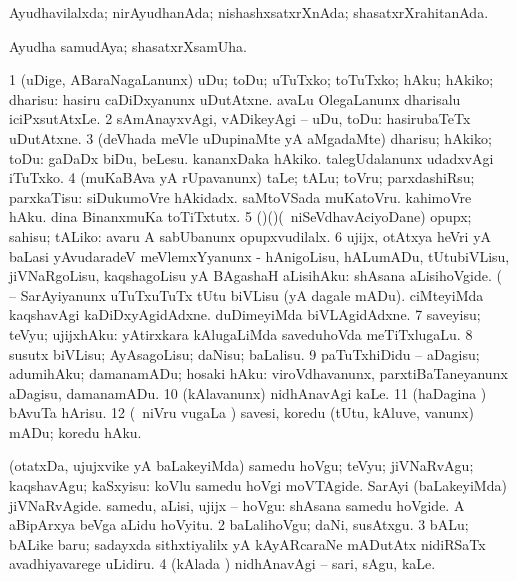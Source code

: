 \bentry
{} 
\gl{\gu}
\expl{}
\bmng
Ayudhavilalxda; nirAyudhanAda; nishashxsatxrXnAda; shasatxrXrahitanAda. 
\emng
\eentry

\bentry
{} 
\gl{\nA}
\expl{}
\bmng
Ayudha samudAya; shasatxrXsamUha. 
\emng
\eentry

\bentry
{} 
\gl{\kirx}
\bmng
\emng

\noindent 
\gl{\sakirx}
\expl{}
\bmng
\bnum
\num{1} (uDige, ABaraNagaLanunx) uDu; toDu; uTuTxko; toTuTxko; hAku; hAkiko; dharisu:  hasiru caDiDxyanunx uDutAtxne.  avaLu OlegaLanunx dharisalu iciPxsutAtxLe. 
\num{2} sAmAnayxvAgi, vADikeyAgi -- uDu, toDu:  hasirubaTeTx uDutAtxne. 
\num{3} (deVhada meVle uDupinaMte yA aMgadaMte) dharisu; hAkiko; toDu:  gaDaDx biDu, beLesu.  kananxDaka hAkiko.  talegUdalanunx udadxvAgi iTuTxko. 
\num{4} (muKaBAva yA rUpavanunx) taLe; tALu; toVru; parxdashiRsu; parxkaTisu:  siDukumoVre hAkidadx.  saMtoVSada muKatoVru.  kahimoVre hAku.  dina BinanxmuKa toTiTxtutx. 
\num{5} (\birx)(\AmA)(\sA\ niSeVdhavAciyoDane) opupx; sahisu; tALiko:  avaru A sabUbanunx opupxvudilalx. 
\num{6} ujijx, otAtxya heVri yA baLasi yAvudaradeV meVlemxYyanunx - hAnigoLisu, hALumADu, tUtubiVLisu, jiVNaRgoLisu, kaqshagoLisu yA BAgashaH aLisihAku:  shAsana aLisihoVgide.  (  -- SarAyiyanunx uTuTxuTuTx tUtu biVLisu (yA dagale mADu).  ciMteyiMda kaqshavAgi kaDiDxyAgidAdxne.  duDimeyiMda biVLAgidAdxne. 
\num{7} saveyisu; teVyu; ujijxhAku:  yAtirxkara kAlugaLiMda saveduhoVda meTiTxlugaLu. 
\num{8} susutx biVLisu; AyAsagoLisu; daNisu; baLalisu. 
\num{9} paTuTxhiDidu -- aDagisu; adumihAku; damanamADu; hosaki hAku:  viroVdhavanunx, parxtiBaTaneyanunx aDagisu, damanamADu. 
\num{10} (kAlavanunx) nidhAnavAgi kaLe. 
\num{11} (haDagina \vi) bAvuTa hArisu. 
\num{12} (\sA\ niVru \mo vugaLa \vi) savesi, koredu (tUtu, kAluve, \mo vanunx) mADu; koredu hAku. 
\enum
\emng

\noindent 
\gl{\akirx}
\expl{}
\bmng
\bnum
{} (otatxDa, ujujxvike yA baLakeyiMda) 
\banum
{} samedu hoVgu; teVyu; jiVNaRvAgu; kaqshavAgu; kaSxyisu:  koVlu samedu hoVgi moVTAgide.  SarAyi (baLakeyiMda) jiVNaRvAgide. 
 samedu, aLisi, ujijx -- hoVgu:  shAsana samedu hoVgide.  A aBipArxya beVga aLidu hoVyitu. 
\eanum
\numie
\num{2} baLalihoVgu; daNi, susAtxgu. 
\num{3} bALu; bALike baru; sadayxda sithxtiyalilx yA kAyARcaraNe mADutAtx nidiRSaTx avadhiyavarege uLidiru. 
\num{4} (kAlada \vi) nidhAnavAgi -- sari, sAgu, kaLe. 
\enum
\emng

